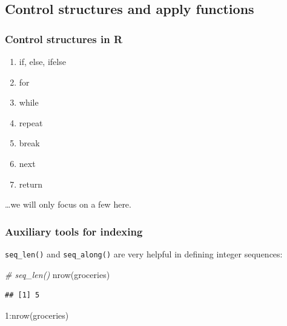 \documentclass[
  11pt,
]{article}
\newenvironment{Shaded}{\begin{snugshade}}{\end{snugshade}}
\newcommand{\CommentTok}[1]{\textcolor[rgb]{0.56,0.35,0.01}{\textit{#1}}}
\newcommand{\DecValTok}[1]{\textcolor[rgb]{0.00,0.00,0.81}{#1}}
\newcommand{\FunctionTok}[1]{\textcolor[rgb]{0.00,0.00,0.00}{#1}}
\newcommand{\NormalTok}[1]{#1}
\newcommand{\SpecialCharTok}[1]{\textcolor[rgb]{0.00,0.00,0.00}{#1}}
\providecommand{\tightlist}{%
  \setlength{\itemsep}{0pt}\setlength{\parskip}{0pt}}
\begin{document}
\hypertarget{control-structures-and-apply-functions}{%
\subsection{Control structures and apply functions}\label{control-structures-and-apply-functions}}

\hypertarget{control-structures-in-r}{%
\subsubsection{Control structures in R}\label{control-structures-in-r}}

\begin{enumerate}
\def\labelenumi{\arabic{enumi}.}
\tightlist
\item
  if, else, ifelse
\item
  for
\item
  while
\item
  repeat
\item
  break
\item
  next
\item
  return
\end{enumerate}

\ldots we will only focus on a few here.

\hypertarget{auxiliary-tools-for-indexing}{%
\subsubsection{Auxiliary tools for indexing}\label{auxiliary-tools-for-indexing}}

\texttt{seq\_len()} and \texttt{seq\_along()} are very helpful in defining integer sequences:

\begin{Shaded}
\begin{Highlighting}[]
\CommentTok{\# seq\_len()}
\FunctionTok{nrow}\NormalTok{(groceries)}
\end{Highlighting}
\end{Shaded}

\begin{verbatim}
## [1] 5
\end{verbatim}

\begin{Shaded}
\begin{Highlighting}[]
\DecValTok{1}\SpecialCharTok{:}\FunctionTok{nrow}\NormalTok{(groceries)}
\end{Highlighting}
\end{Shaded}
\end{document}
